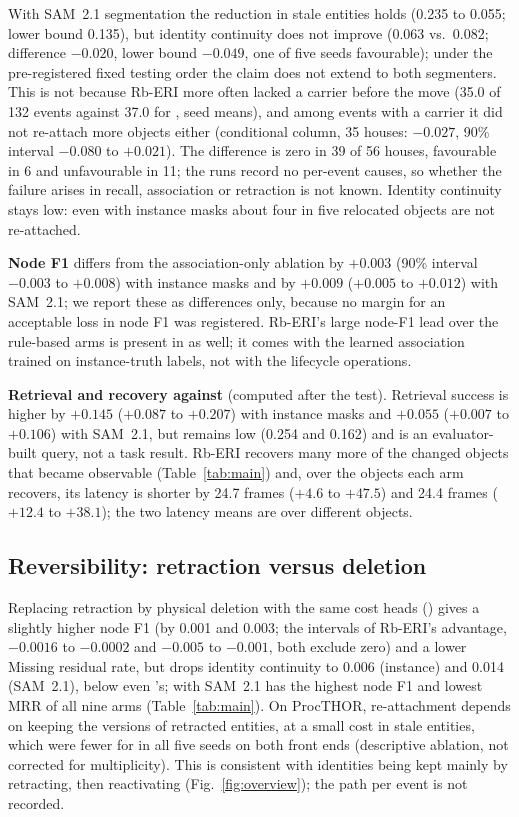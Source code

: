 With SAM~2.1 segmentation the reduction in stale entities holds (0.235 to 0.055; lower bound 0.135), but identity continuity does not improve (0.063 vs.\ 0.082; difference $-0.020$, lower bound $-0.049$, one of five seeds favourable); under the pre-registered fixed testing order the claim does not extend to both segmenters.
This is not because Rb-ERI more often lacked a carrier before the move (35.0 of 132 events against 37.0 for , seed means), and among events with a carrier it did not re-attach more objects either (conditional column, 35 houses: $-0.027$, 90\% interval $-0.080$ to $+0.021$).
The difference is zero in 39 of 56 houses, favourable in 6 and unfavourable in 11; the runs record no per-event causes, so whether the failure arises in recall, association or retraction is not known.
Identity continuity stays low: even with instance masks about four in five relocated objects are not re-attached.

\textbf{Node F1} differs from the association-only ablation by $+0.003$ (90\% interval $-0.003$ to $+0.008$) with instance masks and by $+0.009$ ($+0.005$ to $+0.012$) with SAM~2.1; we report these as differences only, because no margin for an acceptable loss in node F1 was registered.
Rb-ERI's large node-F1 lead over the rule-based arms is present in  as well; it comes with the learned association trained on instance-truth labels, not with the lifecycle operations.

\textbf{Retrieval and recovery against } (computed after the test).
Retrieval success is higher by $+0.145$ ($+0.087$ to $+0.207$) with instance masks and $+0.055$ ($+0.007$ to $+0.106$) with SAM~2.1, but remains low (0.254 and 0.162) and is an evaluator-built query, not a task result.
Rb-ERI recovers many more of the changed objects that became observable (Table~\ref{tab:main}) and, over the objects each arm recovers, its latency is shorter by 24.7 frames ($+4.6$ to $+47.5$) and 24.4 frames ($+12.4$ to $+38.1$); the two latency means are over different objects.

\subsection{Reversibility: retraction versus deletion}
Replacing retraction by physical deletion with the same cost heads () gives a slightly higher node F1 (by 0.001 and 0.003; the intervals of Rb-ERI's advantage, $-0.0016$ to $-0.0002$ and $-0.005$ to $-0.001$, both exclude zero) and a lower Missing residual rate, but drops identity continuity to 0.006 (instance) and 0.014 (SAM~2.1), below even 's; with SAM~2.1  has the highest node F1 and lowest MRR of all nine arms (Table~\ref{tab:main}).
On ProcTHOR, re-attachment depends on keeping the versions of retracted entities, at a small cost in stale entities, which were fewer for  in all five seeds on both front ends (descriptive ablation, not corrected for multiplicity). This is consistent with identities being kept mainly by retracting, then reactivating (Fig.~\ref{fig:overview}); the path per event is not recorded.

